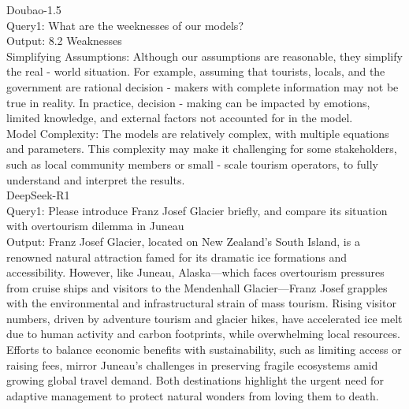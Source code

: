 \documentclass{mcmthesis}
\begin{document}
\begin{ReportAiUse}{9}
Doubao-1.5 \\
Query1: What are the weeknesses of our models? \\
Output: 
8.2 Weaknesses \\
Simplifying Assumptions: Although our assumptions are reasonable, they simplify the real - world situation. For example, assuming that tourists, locals, and the government are rational decision - makers with complete information may not be true in reality. In practice, decision - making can be impacted by emotions, limited knowledge, and external factors not accounted for in the model. \\
Model Complexity: The models are relatively complex, with multiple equations and parameters. This complexity may make it challenging for some stakeholders, such as local community members or small - scale tourism operators, to fully understand and interpret the results. \\

DeepSeek-R1 \\
Query1: Please introduce Franz Josef Glacier briefly, and compare its situation with overtourism dilemma in Juneau \\
Output: 
Franz Josef Glacier, located on New Zealand's South Island, is a renowned natural attraction famed for its dramatic ice formations and accessibility. 
However, like Juneau, Alaska—which faces overtourism pressures from cruise ships and visitors to the Mendenhall Glacier—Franz Josef grapples with the environmental and infrastructural strain of mass tourism. 
Rising visitor numbers, driven by adventure tourism and glacier hikes, have accelerated ice melt due to human activity and carbon footprints, while overwhelming local resources. 
Efforts to balance economic benefits with sustainability, such as limiting access or raising fees, mirror Juneau’s challenges in preserving fragile ecosystems amid growing global travel demand. 
Both destinations highlight the urgent need for adaptive management to protect natural wonders from loving them to death.

\end{ReportAiUse}
\end{document}
